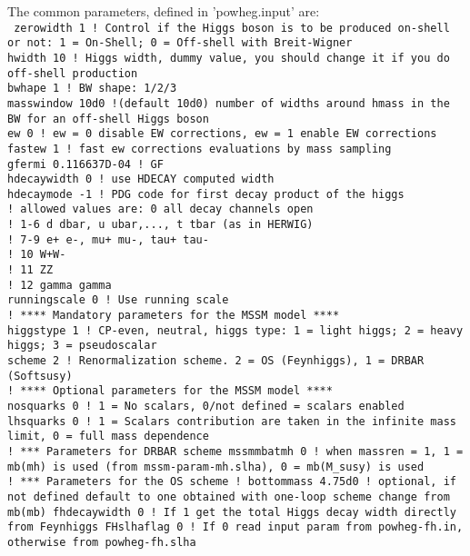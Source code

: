 \documentclass[paper]{JHEP3}
\begin{document}
The  common parameters, defined in 'powheg.input' are: \\
{\tt
zerowidth 1 ! Control if the Higgs boson is to be produced on-shell or not: 1 = On-Shell; 0 = Off-shell with Breit-Wigner\\
hwidth 10   ! Higgs width, dummy value, you should change it if you do off-shell production\\
bwhape 1       ! BW shape: 1/2/3\\
masswindow 10d0  !(default 10d0) number of widths around hmass in the BW for an off-shell Higgs boson\\
ew 0                     ! ew = 0 disable EW corrections, ew = 1 enable EW corrections\\
fastew 1                   ! fast ew corrections evaluations by mass sampling\\
gfermi 0.116637D-04        ! GF\\
hdecaywidth 0   ! use HDECAY computed width\\
hdecaymode -1      ! PDG code for first decay product of the higgs\\
! allowed values are:  0 all decay channels open\\
!                      1-6 d dbar, u ubar,..., t tbar (as in HERWIG)\\
!                      7-9 e+ e-, mu+ mu-, tau+ tau-\\
!                      10  W+W-\\
!                      11  ZZ\\
!                      12  gamma gamma\\
runningscale 0 ! Use running scale\\
! **** Mandatory parameters for the MSSM model ****\\
higgstype 1 ! CP-even, neutral, higgs type: 1 = light higgs; 2 = heavy higgs; 3 = pseudoscalar\\
scheme 2    ! Renormalization scheme. 2 = OS (Feynhiggs), 1 = DRBAR (Softsusy)\\ 
! **** Optional parameters for the MSSM model  ****\\
nosquarks 0 ! 1 = No scalars, 0/not defined = scalars enabled\\
lhsquarks 0 ! 1 = Scalars contribution are taken in the infinite mass limit, 0 = full mass dependence\\
! *** Parameters for DRBAR scheme
mssmmbatmh 0 ! when massren = 1, 1 = mb(mh) is used (from mssm-param-mh.slha), 0 = mb(M\_susy) is used\\
! *** Parameters for the OS scheme
! bottommass 4.75d0 ! optional, if not defined default to one obtained with one-loop scheme change from mb(mb)
fhdecaywidth 0 ! If 1 get the total Higgs decay width directly from Feynhiggs
FHslhaflag 0  ! If 0 read input param from powheg-fh.in, otherwise from powheg-fh.slha\\
}
\end{document}
